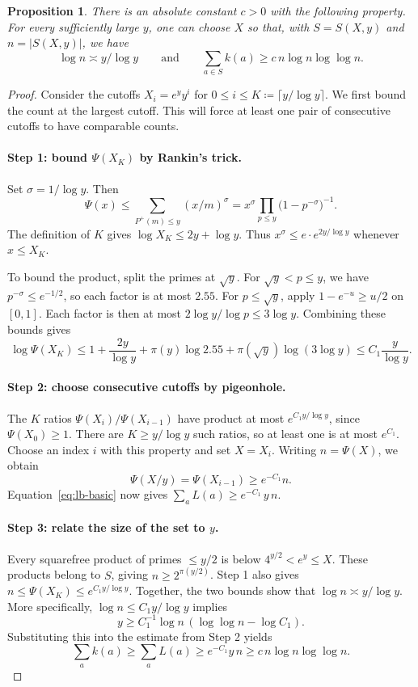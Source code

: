 \documentclass[11pt]{article}
\newtheorem{proposition}[theorem]{Proposition}
\theoremstyle{remark}
\newcommand{\Pplus}{P^{+}}
\begin{document}
\begin{proposition}\label{prop:lb}
There is an absolute constant $c>0$ with the following property.
For every sufficiently large $y$, one can choose $X$ so that, with $S=S(X,y)$ and $n=|S(X,y)|$, we have
\[
  \log n\asymp y/\log y
  \qquad\text{and}\qquad
  \sum_{a\in S}k(a)\ge c\,n\log n\log\log n.
\]
\end{proposition}

\begin{proof}
Consider the cutoffs $X_i=e^{y}y^{i}$ for $0\le i\le K\coloneqq\lceil y/\log y\rceil$.
We first bound the count at the largest cutoff.
This will force at least one pair of consecutive cutoffs to have comparable counts.

\paragraph{Step 1: bound $\Psi(X_K)$ by Rankin's trick.}
Set $\sigma=1/\log y$.
Then
\[
  \Psi(x)\le\sum_{\Pplus(m)\le y}(x/m)^{\sigma}=x^{\sigma}\prod_{p\le y}\bigl(1-p^{-\sigma}\bigr)^{-1}.
\]
The definition of $K$ gives $\log X_K\le 2y+\log y$.
Thus $x^\sigma\le e\cdot e^{2y/\log y}$ whenever $x\le X_K$.

To bound the product, split the primes at $\sqrt y$.
For $\sqrt y<p\le y$, we have $p^{-\sigma}\le e^{-1/2}$, so each factor is at most $2.55$.
For $p\le\sqrt y$, apply $1-e^{-u}\ge u/2$ on $[0,1]$.
Each factor is then at most $2\log y/\log p\le 3\log y$.
Combining these bounds gives
\[
  \log\Psi(X_K)\le 1+\frac{2y}{\log y}+\pi(y)\log 2.55+\pi(\sqrt y)\log(3\log y)\le C_1\frac{y}{\log y}.
\]

\paragraph{Step 2: choose consecutive cutoffs by pigeonhole.}
The $K$ ratios $\Psi(X_i)/\Psi(X_{i-1})$ have product at most $e^{C_1y/\log y}$, since $\Psi(X_0)\ge1$.
There are $K\ge y/\log y$ such ratios, so at least one is at most $e^{C_1}$.
Choose an index $i$ with this property and set $X=X_i$.
Writing $n=\Psi(X)$, we obtain
\[
  \Psi(X/y)=\Psi(X_{i-1})\ge e^{-C_1}n.
\]
Equation~\eqref{eq:lb-basic} now gives $\sum_a L(a)\ge e^{-C_1}\,y\,n$.

\paragraph{Step 3: relate the size of the set to $y$.}
Every squarefree product of primes $\le y/2$ is below $4^{y/2}<e^{y}\le X$.
These products belong to $S$, giving $n\ge 2^{\pi(y/2)}$.
Step 1 also gives $n\le\Psi(X_K)\le e^{C_1y/\log y}$.
Together, the two bounds show that $\log n\asymp y/\log y$.
More specifically, $\log n\le C_1 y/\log y$ implies
\[
  y\ge C_1^{-1}\log n\,(\log\log n-\log C_1).
\]
Substituting this into the estimate from Step 2 yields
\[
  \sum_a k(a)\ge\sum_a L(a)\ge e^{-C_1}y\,n\ge c\,n\log n\log\log n.
\]
\end{proof}
\end{document}
